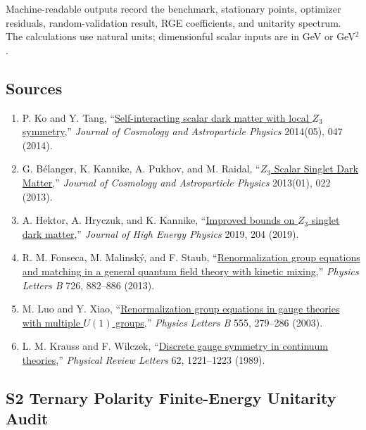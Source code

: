 \documentclass[
]{article}
\providecommand{\tightlist}{%
  \setlength{\itemsep}{0pt}\setlength{\parskip}{0pt}}
\begin{document}
Machine-readable outputs record the benchmark, stationary points,
optimizer residuals, random-validation result, RGE coefficients, and
unitarity spectrum. The calculations use natural units; dimensionful
scalar inputs are in GeV or GeV\(^2\).

\hypertarget{sources}{%
\subsection{Sources}\label{sources}}

\begin{enumerate}
\def\labelenumi{\arabic{enumi}.}
\tightlist
\item
  P. Ko and Y. Tang,
  ``\href{https://doi.org/10.1088/1475-7516/2014/05/047}{Self-interacting
  scalar dark matter with local \(Z_3\) symmetry},'' \emph{Journal of
  Cosmology and Astroparticle Physics} 2014(05), 047 (2014).
\item
  G. Bélanger, K. Kannike, A. Pukhov, and M. Raidal,
  ``\href{https://doi.org/10.1088/1475-7516/2013/01/022}{\(Z_3\) Scalar
  Singlet Dark Matter},'' \emph{Journal of Cosmology and Astroparticle
  Physics} 2013(01), 022 (2013).
\item
  A. Hektor, A. Hryczuk, and K. Kannike,
  ``\href{https://doi.org/10.1007/JHEP03(2019)204}{Improved bounds on
  \(Z_3\) singlet dark matter},'' \emph{Journal of High Energy Physics}
  2019, 204 (2019).
\item
  R. M. Fonseca, M. Malinský, and F. Staub,
  ``\href{https://doi.org/10.1016/j.physletb.2013.09.042}{Renormalization
  group equations and matching in a general quantum field theory with
  kinetic mixing},'' \emph{Physics Letters B} 726, 882--886 (2013).
\item
  M. Luo and Y. Xiao,
  ``\href{https://doi.org/10.1016/S0370-2693(03)00076-5}{Renormalization
  group equations in gauge theories with multiple \(U(1)\) groups},''
  \emph{Physics Letters B} 555, 279--286 (2003).
\item
  L. M. Krauss and F. Wilczek,
  ``\href{https://doi.org/10.1103/PhysRevLett.62.1221}{Discrete gauge
  symmetry in continuum theories},'' \emph{Physical Review Letters} 62,
  1221--1223 (1989).
\end{enumerate}

\newpage

\hypertarget{s2-ternary-polarity-finite-energy-unitarity-audit}{%
\subsection{S2 Ternary Polarity Finite-Energy Unitarity
Audit}\label{s2-ternary-polarity-finite-energy-unitarity-audit}}
\end{document}
